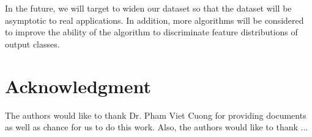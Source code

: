 \documentclass[journal, twocolumn]{IEEEtran}
\begin{document}
In the future, we will target to widen our dataset so that the dataset will be asymptotic to real applications. In addition, more algorithms will be considered to improve the ability of the algorithm to discriminate feature distributions of output classes.


\section*{Acknowledgment}

The authors would like to thank Dr. Pham Viet Cuong for providing documents as well as chance for us to do this work. Also, the authors would like to thank ...


\begin{thebibliography}{9}

\end{thebibliography}
\end{document}
